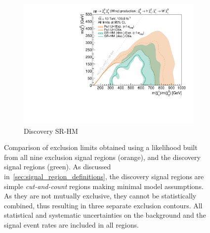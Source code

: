 \begin{figure}
\begin{subfigure}[b]{0.5\textwidth}
		\centering\includegraphics[width=\textwidth]{exclusion_1Lbb_SRHM_noLabel_v2}
		\caption{Discovery SR-HM\label{fig:single_bin_SRHM}}
	\end{subfigure}%
	\caption{Comparison of exclusion limits obtained using a likelihood built from all nine exclusion signal regions (orange), and the discovery signal regions (green). As discussed in~\cref{sec:signal_region_definitions}, the discovery signal regions are simple \textit{cut-and-count} regions making minimal model assumptions. As they are not mutually exclusive, they cannot be statistically combined, thus resulting in three separate exclusion contours. All statistical and systematic uncertainties on the background and the signal event rates are included in all regions.}\label{fig:single_bin}
\end{figure}

